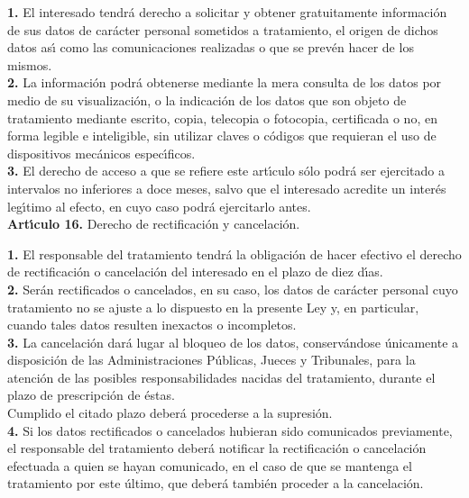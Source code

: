 {\bf 1.} El interesado tendr\'a derecho a solicitar y obtener gratuitamente 
informaci\'on de sus datos de car\'acter personal sometidos a tratamiento, el 
origen de dichos datos as\'{\i} como las comunicaciones realizadas o que se 
prev\'en hacer de los mismos.\\

{\bf 2.} La informaci\'on podr\'a obtenerse mediante la mera consulta de los 
datos por medio de su visualizaci\'on, o la indicaci\'on de los datos que son 
objeto de tratamiento mediante escrito, copia, telecopia o fotocopia, 
certificada o no, en forma legible e inteligible, sin utilizar claves o 
c\'odigos que requieran el uso de dispositivos mec\'anicos espec\'{\i}ficos.\\

{\bf 3.} El derecho de acceso a que se refiere este art\'{\i}culo s\'olo 
podr\'a ser ejercitado a intervalos no inferiores a doce meses, salvo que el 
interesado acredite un inter\'es leg\'{\i}timo al efecto, en cuyo caso podr\'a 
ejercitarlo antes.
\vspace{0.3cm}\\
{\large {\bf Art\'{\i}culo 16.} Derecho de rectificaci\'on y cancelaci\'on.}

{\bf 1.} El responsable del tratamiento tendr\'a la obligaci\'on de hacer 
efectivo el derecho de rectificaci\'on o cancelaci\'on del interesado en el 
plazo de diez d\'{\i}as.\\

{\bf 2.} Ser\'an rectificados o cancelados, en su caso, los datos de car\'acter 
personal cuyo tratamiento no se ajuste a lo dispuesto en la presente Ley y, 
en particular, cuando tales datos resulten inexactos o incompletos.\\

{\bf 3.} La cancelaci\'on dar\'a lugar al bloqueo de los datos, conserv\'andose 
\'unicamente a disposici\'on de las Administraciones P\'ublicas, Jueces y 
Tribunales, para la atenci\'on de las posibles responsabilidades nacidas del 
tratamiento, durante el plazo de prescripci\'on de \'estas.\\
Cumplido el citado plazo deber\'a procederse a la supresi\'on.\\

{\bf 4.} Si los datos rectificados o cancelados hubieran sido comunicados 
previamente, el responsable del tratamiento deber\'a notificar la 
rectificaci\'on o cancelaci\'on efectuada a quien se hayan comunicado, en el 
caso de que se mantenga el tratamiento por este \'ultimo, que deber\'a 
tambi\'en proceder a la cancelaci\'on.\\

